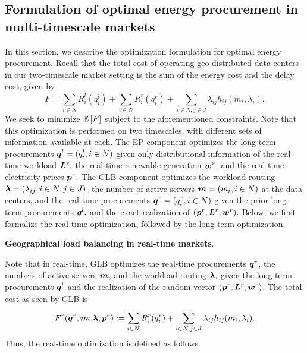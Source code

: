 \subsection{Formulation of optimal energy procurement in multi-timescale markets}

In this section, we describe the optimization formulation for optimal energy procurement. Recall that the total cost of operating geo-distributed data centers in our two-timescale market setting is the sum of the energy cost and the delay cost, given by $$F = \sum_{i\in N}^{} R^l_i(q^l_i) + \sum_{i \in N}^{} R_i^r(q^r_i)+ \sum_{i \in N,j \in J} \lambda_{ij}h_{ij}(m_i,\lambda_i).$$
We seek to minimize $\mathbb{E}\left[F\right]$ subject to the aforementioned constraints. Note that this optimization is performed on two timescales, with different sets of information available at each. The EP component optimizes the long-term procurements $\boldsymbol{q}^l = (q^l_i, i\in N)$ given only distributional information of the real-time workload $\boldsymbol{L}^r,$
the real-time renewable generation $\boldsymbol{w}^r,$ and the real-time electricity prices $\boldsymbol{p}^r.$ The GLB component optimizes the workload routing $\boldsymbol{\lambda} = (\lambda_{ij},i\in N,j \in J),$ the number of active servers $\boldsymbol{m} = (m_i,i \in N)$ at the data centers, and the real-time procurements $\boldsymbol{q}^r = (q^r_i,i \in
N)$ given the prior long-term procurements $\boldsymbol{q}^l,$ and the exact realization of $(\boldsymbol{p}^r,\boldsymbol{L}^r,\boldsymbol{w}^r).$
Below, we first formalize the real-time optimization, followed by the long-term optimization.

\textbf{Geographical load balancing in real-time markets}. 

Note that in real-time, GLB optimizes the real-time procurements
$\boldsymbol{q}^r$, the numbers of active servers $\boldsymbol{m}$, and the workload routing $\boldsymbol{\lambda},$ given the long-term procurements $\boldsymbol{q}^l$ and the realization of the random vector $(\boldsymbol{p}^r,\boldsymbol{L}^r,\boldsymbol{w}^r).$ The total cost as seen by GLB is $$F^r(\boldsymbol{q}^r, \boldsymbol{m},\boldsymbol{\lambda},\boldsymbol{p}^r)
:= \sum_{i \in N}^{} R_i^r(q^r_i)+ \sum_{i\in N, j \in J}
\lambda_{ij}h_{ij}(m_i,\lambda_i).$$ Thus, the real-time optimization is defined as follows.

